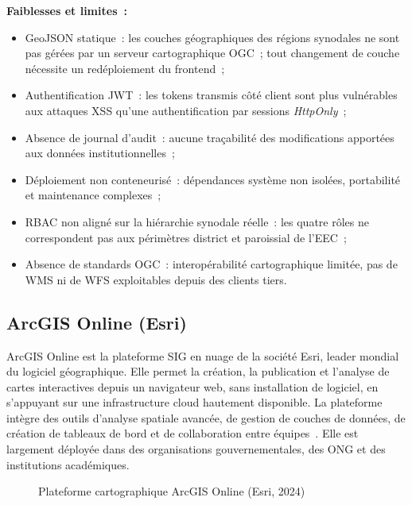 \documentclass[12pt, a4paper]{report}
\begin{document}
\noindent\textbf{Faiblesses et limites~:}
\begin{itemize}[itemsep=2pt, topsep=4pt, leftmargin=1.5cm]
  \item GeoJSON statique~: les couches géographiques des régions synodales ne
    sont pas gérées par un serveur cartographique OGC~; tout changement de
    couche nécessite un redéploiement du frontend~;
  \item Authentification JWT~: les tokens transmis côté client sont plus
    vulnérables aux attaques XSS qu'une authentification par sessions
    \textit{HttpOnly}~;
  \item Absence de journal d'audit~: aucune traçabilité des modifications
    apportées aux données institutionnelles~;
  \item Déploiement non conteneurisé~: dépendances système non isolées,
    portabilité et maintenance complexes~;
  \item RBAC non aligné sur la hiérarchie synodale réelle~: les quatre rôles
    ne correspondent pas aux périmètres district et paroissial de l'EEC~;
  \item Absence de standards OGC~: interopérabilité cartographique limitée, pas
    de WMS ni de WFS exploitables depuis des clients tiers.
\end{itemize}

\subsection{ArcGIS Online (Esri)}

ArcGIS Online est la plateforme SIG en nuage de la société Esri, leader mondial
du logiciel géographique. Elle permet la création, la publication et l'analyse de
cartes interactives depuis un navigateur web, sans installation de logiciel, en
s'appuyant sur une infrastructure cloud hautement disponible. La plateforme intègre
des outils d'analyse spatiale avancée, de gestion de couches de données, de
création de tableaux de bord et de collaboration entre
équipes~\cite{arcgisonline2024}. Elle est largement déployée dans des organisations
gouvernementales, des ONG et des institutions académiques.

\begin{figure}[H]
  \centering
  \caption{Plateforme cartographique ArcGIS Online (Esri, 2024)}
  \label{fig:arcgis-online}
\end{figure}
\end{document}

